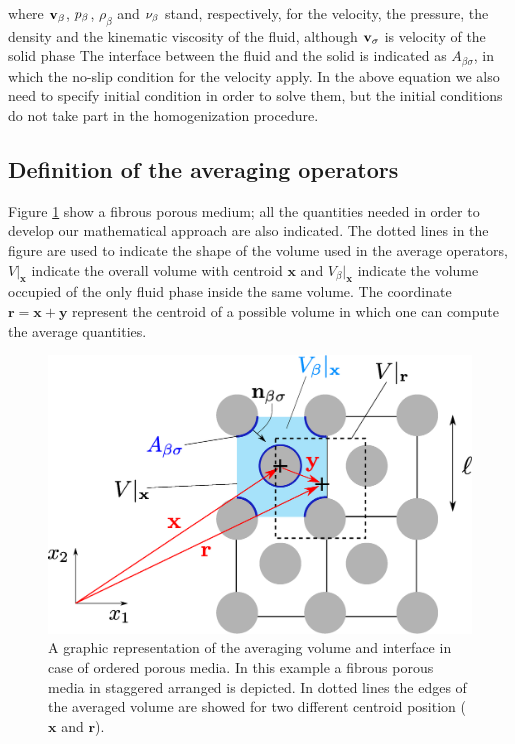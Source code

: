 where $\textbf{v}_{\beta}$, $p_{\beta}$, $\rho_{\beta}$ and $\nu_{\beta}$ stand, respectively, for  the velocity, the pressure, the density and the kinematic viscosity of the fluid, although  $\textbf{v}_{\sigma}$ is velocity of the solid phase
The interface between the fluid and the solid is indicated as $A_{\beta\sigma}$, in which the no-slip condition for the velocity apply.
In the above equation we also need to specify initial condition in order to solve them, but the initial conditions do not take part in the homogenization procedure.

\subsection{Definition of the averaging operators}



Figure \ref{fig:rev} show a fibrous porous medium; all the quantities needed in order to develop our mathematical approach are also indicated.
The dotted lines in the figure are used to indicate the shape of the volume used in the average operators, $V|_{\mathbf{x}}$ indicate the overall volume with centroid $\mathbf{x}$ and $V_{\beta}|_{\mathbf{x}}$ indicate the volume occupied of the only fluid phase inside the same volume.
The coordinate $\mathbf{r} = \mathbf{x} +\mathbf{y}$ represent the centroid of a possible volume in which one can compute the average quantities.

\begin{figure}[h!]
	\centering
	\includegraphics[width=0.7\linewidth]{chapter_2/figure/REV}
	\caption{A graphic representation of the averaging volume and interface in case of ordered porous media. In this example a fibrous  porous media in staggered arranged is depicted. In dotted lines the edges of the averaged volume are showed for two different centroid position ($\mathbf{x}$ and $\mathbf{r}$).}
	\label{fig:rev}
\end{figure}

